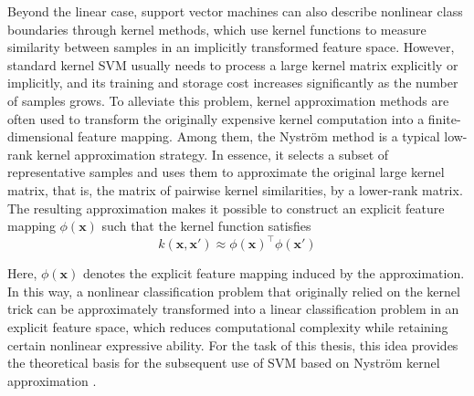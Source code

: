 \par Beyond the linear case, support vector machines can also describe nonlinear
class boundaries through kernel methods, which use kernel functions to measure
similarity between samples in an implicitly transformed feature space. However,
standard kernel SVM usually needs to process a large kernel matrix explicitly or
implicitly, and its training and storage cost increases significantly as the
number of samples grows. To alleviate this problem, kernel approximation methods
are often used to transform the originally expensive kernel computation into a
finite-dimensional feature mapping. Among them, the Nystr\"{o}m method is a
typical low-rank kernel approximation strategy. In essence, it selects a subset
of representative samples and uses them to approximate the original large kernel
matrix, that is, the matrix of pairwise kernel similarities, by a lower-rank
matrix. The resulting approximation makes it possible to construct an explicit
feature mapping $\phi(\mathbf{x})$ such that the kernel function satisfies
\begin{equation}
    k(\mathbf{x},\mathbf{x}')\approx \phi(\mathbf{x})^\top\phi(\mathbf{x}')
    \label{eq:nystrom-basic}
\end{equation}
\par Here, $\phi(\mathbf{x})$ denotes the explicit feature mapping induced by
the approximation. In this way, a nonlinear classification problem that
originally relied on the kernel trick can be approximately transformed into a
linear classification problem in an explicit feature space, which reduces
computational complexity while retaining certain nonlinear expressive ability.
For the task of this thesis, this idea provides the theoretical basis for the
subsequent use of SVM based on Nystr\"{o}m kernel approximation
\cite{williams2001using,scholkopf2002learning}.

